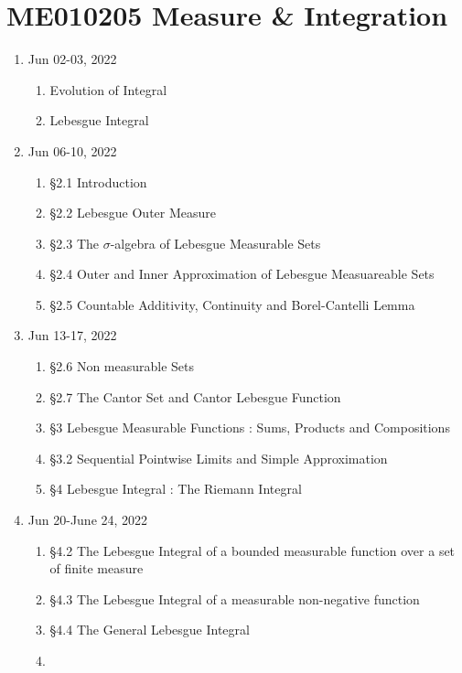 \chapter{ME010205 Measure \& Integration}
\begin{enumerate}[label=Week \arabic*]
	\item Jun 02-03, 2022
	\begin{enumerate}[label=Day \arabic*]
		\item 
			Evolution of Integral
		\item
			Lebesgue Integral
	\end{enumerate}
	\item Jun 06-10, 2022 
	\begin{enumerate}[label=Day \arabic*]
		\item 
			\S2.1 Introduction 
		\item 
			\S2.2 Lebesgue Outer Measure
		\item 
			\S2.3 The $\sigma$-algebra of Lebesgue Measurable Sets
		\item 
			\S2.4 Outer and Inner Approximation of Lebesgue Measuareable Sets\\
		\item 
			\S2.5 Countable Additivity, Continuity and Borel-Cantelli Lemma
	\end{enumerate}
	\item Jun 13-17, 2022 
	\begin{enumerate}[label=Day \arabic*]
		\item 
			\S2.6 Non measurable Sets
		\item 
			\S2.7 The Cantor Set and Cantor Lebesgue Function
		\item 
			\S3 Lebesgue Measurable Functions : Sums, Products and Compositions
		\item 
			\S3.2 Sequential Pointwise Limits and Simple Approximation
		\item 
			\S4 Lebesgue Integral : The Riemann Integral
	\end{enumerate}
	\item Jun 20-June 24, 2022 
	\begin{enumerate}[label=Day \arabic*]
		\item 
			\S4.2 The Lebesgue Integral of a bounded measurable function over a set of finite measure
		\item 
			\S4.3 The Lebesgue Integral of a measurable non-negative function
		\item 
			\S4.4 The General Lebesgue Integral
		\item 

\end{enumerate}
\end{enumerate}
